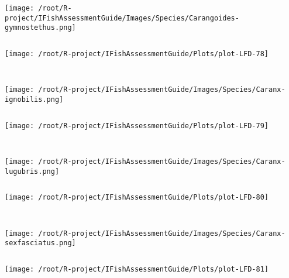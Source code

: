 \begin{knitrout}
\begin{kframe}
\begin{verbatim}
\end{verbatim}
\end{kframe}
\texttt{[image: /root/R-project/IFishAssessmentGuide/Images/Species/Carangoides-gymnostethus.png]}
\begin{kframe}\begin{verbatim}
\end{verbatim}
\end{kframe}
\texttt{[image: /root/R-project/IFishAssessmentGuide/Plots/plot-LFD-78]} 
\begin{kframe}\begin{verbatim}
 
\end{verbatim}
\end{kframe}
\texttt{[image: /root/R-project/IFishAssessmentGuide/Images/Species/Caranx-ignobilis.png]}
\begin{kframe}\begin{verbatim}
\end{verbatim}
\end{kframe}
\texttt{[image: /root/R-project/IFishAssessmentGuide/Plots/plot-LFD-79]} 
\begin{kframe}\begin{verbatim}
 
\end{verbatim}
\end{kframe}
\texttt{[image: /root/R-project/IFishAssessmentGuide/Images/Species/Caranx-lugubris.png]}
\begin{kframe}\begin{verbatim}
\end{verbatim}
\end{kframe}
\texttt{[image: /root/R-project/IFishAssessmentGuide/Plots/plot-LFD-80]} 
\begin{kframe}\begin{verbatim}
 
\end{verbatim}
\end{kframe}
\texttt{[image: /root/R-project/IFishAssessmentGuide/Images/Species/Caranx-sexfasciatus.png]}
\begin{kframe}\begin{verbatim}
\end{verbatim}
\end{kframe}
\texttt{[image: /root/R-project/IFishAssessmentGuide/Plots/plot-LFD-81]} 
\begin{kframe}\begin{verbatim}
 

\end{verbatim}
\end{kframe}
\end{knitrout}
